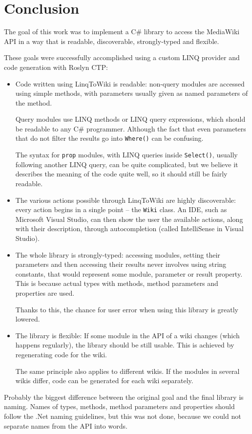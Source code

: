 \chapter*{Conclusion}

The goal of this work was to implement a C\# library to access the MediaWiki API
in a way that is readable, discoverable, strongly-typed and flexible.

These goals were successfully accomplished using a custom LINQ provider and code generation with Roslyn CTP:

\begin{itemize}
\item Code written using LinqToWiki is readable:
non-query modules are accessed using simple methods,
with parameters usually given as named parameters of the method.

Query modules use LINQ methods or LINQ query expressions,
which should be readable to any C\# programmer.
Although the fact that even parameters that do not filter the results go into \lstinline{Where()} can be confusing.

The syntax for \texttt{prop} modules, with LINQ queries inside \lstinline{Select()},
usually following another LINQ query, can be quite complicated,
but we believe it describes the meaning of the code quite well,
so it should still be fairly readable.

\item The various actions possible through LinqToWiki are highly discoverable:
every action begins in a single point – the \lstinline{Wiki} class.
An IDE, such as Microsoft Visual Studio,
can then show the user the available actions, along with their description,
through autocompletion (called IntelliSense in Visual Studio).

\item The whole library is strongly-typed:
accessing modules, setting their parameters and then accessing their results
never involves using string constants,
that would represent some module, parameter or result property.
This is because actual types with methods, method parameters and properties are used.

Thanks to this, the chance for user error when using this library is greatly lowered.

\item The library is flexible: If some module in the API of a wiki changes
(which happens regularly), the library should be still usable.
This is achieved by regenerating code for the wiki.

The same principle also applies to different wikis.
If the modules in several wikis differ, code can be generated for each wiki separately.
\end{itemize}

\medskip

Probably the biggest difference between the original goal and the final library is naming.
Names of types, methods, method parameters and properties should follow the .Net naming guidelines,
but this was not done, because we could not separate names from the API into words.

